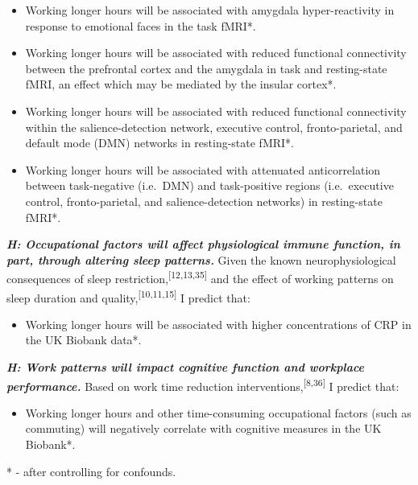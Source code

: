 \documentclass[
  english,
  man,draftall]{apa6}
\providecommand{\tightlist}{%
  \setlength{\itemsep}{0pt}\setlength{\parskip}{0pt}}
\begin{document}
\begin{itemize}
\item
  Working longer hours will be associated with amygdala hyper-reactivity in response to emotional faces in the task fMRI*.
\item
  Working longer hours will be associated with reduced functional connectivity between the prefrontal cortex and the amygdala in task and resting-state fMRI, an effect which may be mediated by the insular cortex*.
\item
  Working longer hours will be associated with reduced functional connectivity within the salience-detection network, executive control, fronto-parietal, and default mode (DMN) networks in resting-state fMRI*.
\item
  Working longer hours will be associated with attenuated anticorrelation between task-negative (i.e.~DMN) and task-positive regions (i.e.~executive control, fronto-parietal, and salience-detection networks) in resting-state fMRI*.
\end{itemize}

\hspace{1cm}

\textbf{\emph{H: Occupational factors will affect physiological immune function, in part, through altering sleep patterns.}} Given the known neurophysiological consequences of sleep restriction,\textsuperscript{{[}12,13,35{]}} and the effect of working patterns on sleep duration and quality,\textsuperscript{{[}10,11,15{]}} I predict that:

\begin{itemize}
\tightlist
\item
  Working longer hours will be associated with higher concentrations of CRP in the UK Biobank data*.
\end{itemize}

\hspace{1cm}

\textbf{\emph{H: Work patterns will impact cognitive function and workplace performance.}} Based on work time reduction interventions,\textsuperscript{{[}8,36{]}} I predict that:

\begin{itemize}
\tightlist
\item
  Working longer hours and other time-consuming occupational factors (such as commuting) will negatively correlate with cognitive measures in the UK Biobank*.
\end{itemize}

* - after controlling for confounds.
\end{document}
